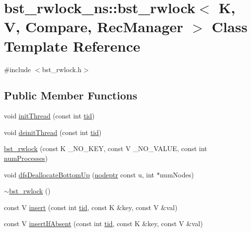 \hypertarget{classbst__rwlock__ns_1_1bst__rwlock}{}\section{bst\+\_\+rwlock\+\_\+ns\+:\+:bst\+\_\+rwlock$<$ K, V, Compare, Rec\+Manager $>$ Class Template Reference}
\label{classbst__rwlock__ns_1_1bst__rwlock}


{\ttfamily \#include $<$bst\+\_\+rwlock.\+h$>$}

\subsection*{Public Member Functions}
\begin{DoxyCompactItemize}
\item 
void \hyperlink{classbst__rwlock__ns_1_1bst__rwlock_a786c88e4bafec7d09dc5f37a43d01aa1}{init\+Thread} (const int \hyperlink{microbench_2main_8cpp_a9ca9869868fe7e7a38a921cc7de4103f}{tid})
\item 
void \hyperlink{classbst__rwlock__ns_1_1bst__rwlock_aea88265b9703e71e6d1ee91814163fd8}{deinit\+Thread} (const int \hyperlink{microbench_2main_8cpp_a9ca9869868fe7e7a38a921cc7de4103f}{tid})
\item 
\hyperlink{classbst__rwlock__ns_1_1bst__rwlock_a8d8cc1557bc6491508dcfacaf12c9db1}{bst\+\_\+rwlock} (const K \+\_\+\+N\+O\+\_\+\+K\+EY, const V \+\_\+\+N\+O\+\_\+\+V\+A\+L\+UE, const int \hyperlink{testing_8cpp_aa085812188e21ede75351d88b9b2c30d}{num\+Processes})
\item 
void \hyperlink{classbst__rwlock__ns_1_1bst__rwlock_aa22ceca1ce1afc2b9b7a362fd779ff3a}{dfs\+Deallocate\+Bottom\+Up} (\hyperlink{bst__rwlock__impl_8h_a04158d2a20768fe447133ff555823b05}{nodeptr} const u, int $\ast$num\+Nodes)
\item 
\hyperlink{classbst__rwlock__ns_1_1bst__rwlock_aeced6e42f96359b65eeb496563af89a6}{$\sim$bst\+\_\+rwlock} ()
\item 
const V \hyperlink{classbst__rwlock__ns_1_1bst__rwlock_ae6c99b27e1a1d69029308fac2db945e3}{insert} (const int \hyperlink{microbench_2main_8cpp_a9ca9869868fe7e7a38a921cc7de4103f}{tid}, const K \&key, const V \&val)
\item 
const V \hyperlink{classbst__rwlock__ns_1_1bst__rwlock_a1b1924a1c36bf81b71fe7c9ccb89ef9b}{insert\+If\+Absent} (const int \hyperlink{microbench_2main_8cpp_a9ca9869868fe7e7a38a921cc7de4103f}{tid}, const K \&key, const V \&val)

\end{DoxyCompactItemize}
